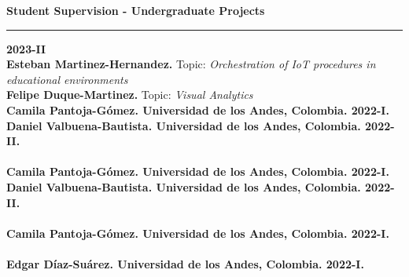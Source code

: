\documentclass[letterpaper,11pt,oneside]{article}
\begin{document}
%
\noindent \Large{\textbf{Student Supervision - Undergraduate Projects} \\
\vspace{-2ex}
\hrule 
\normalsize
\vspace{2ex}
\noindent\textbf{2023-II}\\
\indent\textbf{Esteban Martinez-Hernandez.} {\footnotesize Topic: \textit{Orchestration of IoT procedures in educational environments}}\\
\indent\textbf{Felipe Duque-Martinez.} {\footnotesize Topic: \textit{Visual Analytics}}\\
\textbf{Camila Pantoja-G\'omez. Universidad de los Andes, Colombia. 2022-I.} \\
\noindent\textbf{Daniel Valbuena-Bautista. Universidad de los Andes, Colombia. 2022-II.} \\
\\
\textbf{Camila Pantoja-G\'omez. Universidad de los Andes, Colombia. 2022-I.} \\
\noindent\textbf{Daniel Valbuena-Bautista. Universidad de los Andes, Colombia. 2022-II.} \\
\\
\textbf{Camila Pantoja-G\'omez. Universidad de los Andes, Colombia. 2022-I.} \\
\\
\textbf{Edgar D\'iaz-Su\'arez. Universidad de los Andes, Colombia. 2022-I.} \\
\\
}
\end{document}
